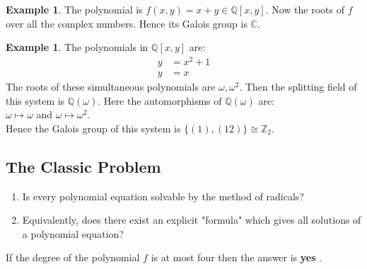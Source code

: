 \documentclass[11pt]{amsart}
\theoremstyle{plain}
\theoremstyle{definition}
\newtheorem{example}[theorem]{Example}
\numberwithin{equation}{section}
\begin{document}
\begin{example}
  The polynomial is \(f(x,y)=x+y \in \mathbb{Q}[x,y]\). Now the roots of \(f\) over all the complex numbers. Hence its Galois group is \(\mathbb{C}\).
\end{example}

\begin{example}
  The polynomials in \(\mathbb{Q}[x,y]\) are:
  \begin{align}
    y &= x^2+1 \\
    y &=x
  \end{align}
  The roots of these simultaneous polynomials are \(\omega, {\omega}^2\). Then the splitting field of this system is \(\mathbb{Q}(\omega)\). Here the automorphisms of \(\mathbb{Q}(\omega)\) are: \\
  \(\omega \longmapsto \omega\) and \hspace{9mm} \(\omega \longmapsto {\omega}^2\).\\
  Hence the Galois group of this system is \(\{(1), (12)\} \cong {\mathbb{Z}}_2\).
\end{example}

\subsection{The Classic Problem}
\begin{enumerate}
\item Is every polynomial equation solvable by the method of radicals?
\item Equivalently, does there exist an explicit "formula" which gives all solutions of a polynomial equation?
\end{enumerate}

If the degree of  the polynomial \(f\) is at most four then the answer is \textbf{yes} \cite{hunger}.\\
\end{document}
